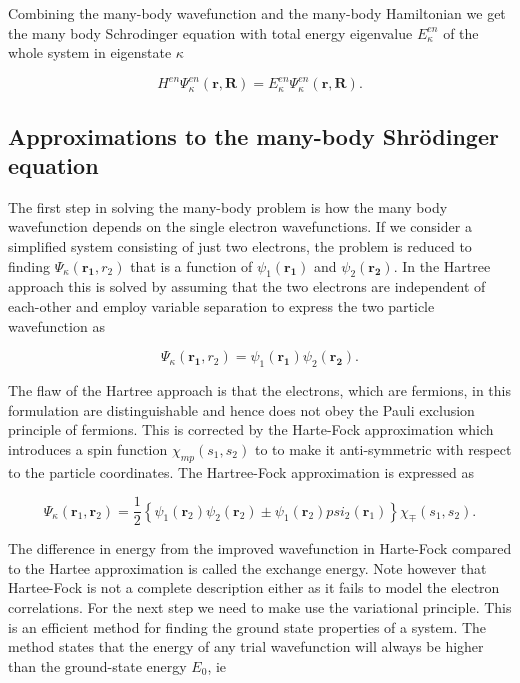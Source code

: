  
Combining the many-body wavefunction and the many-body Hamiltonian we get the many body Schrodinger equation with total energy eigenvalue $E_{\kappa}^{en}$ of the whole system in eigenstate $\kappa$
 
\begin{equation}
H^{en}\Psi^{en}_{\kappa}(\boldsymbol{r}, \boldsymbol{R}) = E_{\kappa}^{en}\Psi_{\kappa}^{en}(\boldsymbol{r}, \boldsymbol{R}).
\end{equation}

\subsection{Approximations to the many-body Shr\"{o}dinger equation}

The first step in solving the many-body problem is how the many body wavefunction depends on the single electron wavefunctions. If we consider a simplified system consisting of just two electrons, the problem is reduced to finding $\Psi_{\kappa}(\boldsymbol{r_1}, r_2)$ that is a function of $\psi_1(\boldsymbol{r_1})$ and $\psi_2(\boldsymbol{r_2})$. In the Hartree approach this is solved by assuming that the two electrons are independent of each-other and employ variable separation to express the two particle wavefunction as

\begin{equation}
\Psi_{\kappa}(\boldsymbol{r_1}, r_2) = \psi_1(\boldsymbol{r_1})\psi_2(\boldsymbol{r_2}).
\end{equation}

The flaw of the Hartree approach is that the electrons, which are fermions, in this formulation are distinguishable and hence does not obey the Pauli exclusion principle of fermions. This is corrected by the Harte-Fock approximation which introduces a spin function $\chi_{mp}(s_1, s_2)$ to to make it anti-symmetric with respect to the particle coordinates. The Hartree-Fock approximation is expressed as

\begin{equation}
\Psi_{\kappa}(\boldsymbol{r}_1, \boldsymbol{r}_2) = \frac{1}{2} \left\{ \psi_1(\boldsymbol{r}_2) \psi_2(\boldsymbol{r}_2) \pm \psi_1(\boldsymbol{r}_2) psi_2(\boldsymbol{r}_1) \right\} \chi_{\mp}(s_1, s_2).
\end{equation}  

The difference in energy from the improved wavefunction in Harte-Fock compared to the Hartee approximation is called the exchange energy. Note however that Hartee-Fock is not a complete description either as it fails to model the electron correlations. For the next step we need to make use the variational principle. This is an efficient method for finding the ground state properties of a system. The method states that the energy of any trial wavefunction will always be higher than the ground-state energy $E_0$, ie

